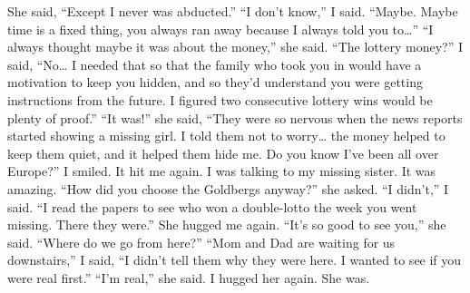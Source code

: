 \documentclass[a4paper]{article}
\begin{document}
She said, “Except I never was abducted.”
“I don’t know,” I said. “Maybe. Maybe time is a fixed thing, you always ran away because I always told you to…”
“I always thought maybe it was about the money,” she said.
“The lottery money?” I said, “No… I needed that so that the family who took you in would have a motivation to keep you hidden, and so they’d understand you were getting instructions from the future. I figured two consecutive lottery wins would be plenty of proof.”
“It was!” she said, “They were so nervous when the news reports started showing a missing girl. I told them not to worry… the money helped to keep them quiet, and it helped them hide me. Do you know I’ve been all over Europe?”
I smiled. It hit me again. I was talking to my missing sister. It was amazing.
“How did you choose the Goldbergs anyway?” she asked.
“I didn’t,” I said. “I read the papers to see who won a double-lotto the week you went missing. There they were.”
She hugged me again. “It’s so good to see you,” she said. “Where do we go from here?”
“Mom and Dad are waiting for us downstairs,” I said, “I didn’t tell them why they were here. I wanted to see if you were real first.”
“I’m real,” she said. I hugged her again.
She was.
\end{document}
